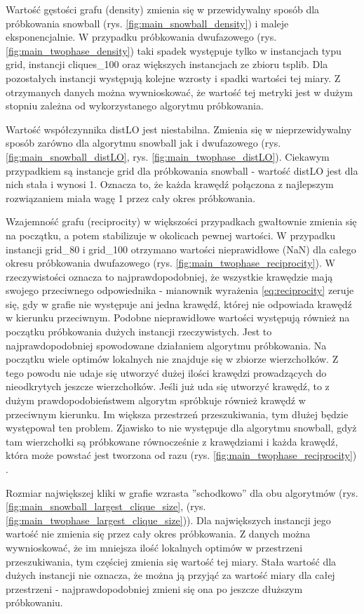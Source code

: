 Wartość gęstości grafu (density) zmienia się w przewidywalny sposób dla próbkowania snowball (rys. \ref{fig:main_snowball_density}) i maleje eksponencjalnie.
W przypadku próbkowania dwufazowego (rys. \ref{fig:main_twophase_density}) taki spadek występuje tylko w instancjach typu grid, instancji cliques\_100 oraz większych
instancjach ze zbioru tsplib.
Dla pozostałych instancji występują kolejne wzrosty i spadki wartości tej miary.
Z otrzymanych danych można wywnioskować, że wartość tej metryki jest w dużym stopniu zależna od wykorzystanego algorytmu próbkowania.

Wartość współczynnika distLO jest niestabilna. Zmienia się w nieprzewidywalny sposób zarówno dla algorytmu snowball jak i dwufazowego (rys. \ref{fig:main_snowball_distLO}, rys. \ref{fig:main_twophase_distLO}).
Ciekawym przypadkiem są instancje grid dla próbkowania snowball - wartość distLO jest dla nich stała i wynosi 1. Oznacza to, że każda krawędź połączona
z najlepszym rozwiązaniem miała wagę 1 przez cały okres próbkowania.

Wzajemność grafu (reciprocity) w większości przypadkach gwałtownie zmienia się na początku, a potem stabilizuje w okolicach pewnej wartości.
W przypadku instancji grid\_80 i grid\_100 otrzymano wartości nieprawidłowe (NaN) dla całego okresu próbkowania dwufazowego (rys. \ref{fig:main_twophase_reciprocity}). W rzeczywistości oznacza to
najprawdopodobniej, że wszystkie krawędzie mają swojego przeciwnego odpowiednika - mianownik wyrażenia \ref{eq:reciprocity} zeruje się, gdy w grafie nie występuje ani jedna krawędź,
której nie odpowiada krawędź w kierunku przeciwnym. Podobne nieprawidłowe wartości występują również na początku próbkowania dużych instancji rzeczywistych.
Jest to najprawdopodobniej spowodowane działaniem algorytmu próbkowania. Na początku wiele optimów lokalnych nie znajduje się w zbiorze wierzchołków.
Z tego powodu nie udaje się utworzyć dużej ilości krawędzi prowadzących do nieodkrytych jeszcze wierzchołków.
Jeśli już uda się utworzyć krawędź, to z dużym prawdopodobieństwem algorytm spróbkuje również krawędź w przeciwnym kierunku.
Im większa przestrzeń przeszukiwania, tym dłużej będzie występował ten problem.
Zjawisko to nie występuje dla algorytmu snowball, gdyż tam wierzchołki są próbkowane równocześnie z krawędziami i każda krawędź, która może powstać jest
tworzona od razu (rys. \ref{fig:main_twophase_reciprocity}) .

Rozmiar największej kliki w grafie wzrasta ''schodkowo'' dla obu algorytmów (rys. \ref{fig:main_snowball_largest_clique_size}, (rys. \ref{fig:main_twophase_largest_clique_size})).
Dla największych instancji jego wartość nie zmienia się przez cały okres próbkowania.
Z danych można wywnioskować, że im mniejsza ilość lokalnych optimów w przestrzeni przeszukiwania, tym częściej zmienia się wartość tej miary.
Stała wartość dla dużych instancji nie oznacza, że można ją przyjąć za wartość miary dla całej przestrzeni - najprawdopodobniej zmieni się
ona po jeszcze dłuższym próbkowaniu.

